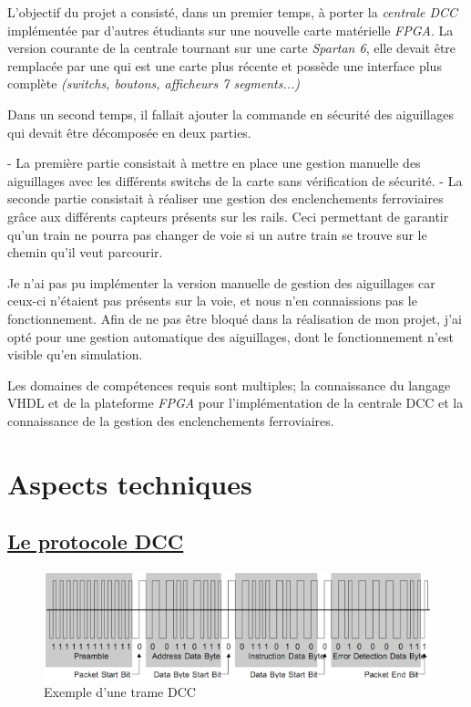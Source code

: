 L'objectif du projet a consisté, dans un premier temps, à porter la
\emph{centrale DCC} implément\'ee par d'autres \'etudiants sur une nouvelle
carte mat\'erielle \emph{FPGA}. La version courante de la centrale tournant sur
une carte \emph{Spartan 6}, elle devait être remplac\'ee par une \crt qui est
une carte plus r\'ecente et possède une interface plus complète
\emph{(switchs, boutons, afficheurs 7 segments...)}

Dans un second temps, il fallait ajouter la commande en
sécurité des aiguillages qui devait être décomposée en deux parties.

     - La première partie consistait à mettre en place une gestion manuelle des aiguillages avec
les diff\'erents switchs de la carte sans v\'erification de
s\'ecurit\'e.
     - La seconde partie consistait à réaliser une gestion des
enclenchements ferroviaires grâce aux différents capteurs pr\'esents sur
les rails. Ceci permettant de garantir qu'un train ne pourra pas
changer de voie si un autre train se trouve sur le chemin
qu'il veut parcourir. 


Je n'ai pas pu implémenter la version manuelle de gestion des aiguillages  car ceux-ci
 n'étaient pas présents sur la voie, et nous n'en connaissions pas
le fonctionnement. Afin de ne pas être bloqué dans la réalisation de mon projet,
j'ai opté pour une gestion automatique des
aiguillages, dont le fonctionnement n'est visible qu'en simulation.


Les domaines de comp\'etences requis sont multiples; la connaissance
du langage VHDL et de la plateforme \emph{FPGA} pour l'impl\'ementation
de la centrale DCC et la connaissance de la gestion des enclenchements
ferroviaires.


\newpage
\section{Aspects techniques}
\label{sec:asp_tech}

\subsection{\underline{Le protocole DCC}}
\label{sec:dcc}


\begin{figure}[h]
\centering
\includegraphics[scale=0.75]{trame.png}
\caption{Exemple d'une trame DCC}
\label{fig1}
\end{figure}

